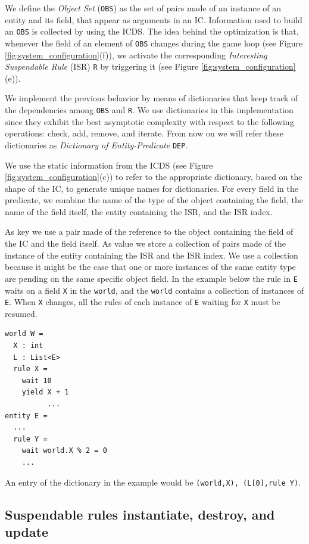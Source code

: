 We define the \emph{Object Set} (\texttt{OBS}) as the set of pairs made of an instance of an entity and its field, that appear as arguments in an IC. Information used to build an \texttt{OBS} is collected by using the ICDS. The idea behind the optimization is that, whenever the field of an element of \texttt{OBS} changes during the game loop (see Figure \ref{fig:system_configuration}(f)), we activate the corresponding \emph{Interesting Suspendable Rule} (ISR) \texttt{R} by triggering it (see Figure \ref{fig:system_configuration}(e)).


We implement the previous behavior by means of dictionaries that keep track of the dependencies among \texttt{OBS} and \texttt{R}. We use dictionaries in this implementation since they exhibit the best asymptotic complexity with respect to the following operations: check, add, remove, and iterate. From now on we will refer these dictionaries as \emph{Dictionary of Entity-Predicate} \texttt{DEP}.

We use the static information from the ICDS (see Figure \ref{fig:system_configuration}(c)) to refer to the appropriate dictionary, based on the shape of the IC, to generate unique names for dictionaries. For every field in the predicate, we combine the name of the type of the object containing the field, the name of the field itself, the entity containing the ISR, and the ISR index.

As key we use a pair made of the reference to the object containing the field of the IC and the field itself. As value we store a collection of pairs made of the instance of the entity containing the ISR and the ISR index. We use a collection because it might be the case that one or more instances of the same entity type are pending on the same specific object field. In the example below the rule in \texttt{E} waits on a field \texttt{X} in the \texttt{world}, and the \texttt{world} contains a collection of instances of \texttt{E}. When \texttt{X} changes, all the rules of each instance of \texttt{E} waiting for \texttt{X} must be resumed.

\begin{lstlisting}
world W = 
  X : int
  L : List<E>
  rule X = 
    wait 10 
    yield X + 1
          ...
entity E = 
  ...
  rule Y = 
    wait world.X % 2 = 0
    ...
\end{lstlisting}

An entry of the dictionary in the example would be \texttt{(world,X), (L[0],rule Y)}.

\subsection{Suspendable rules instantiate, destroy, and update}

